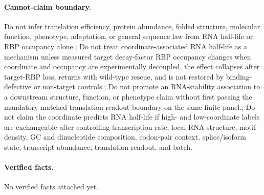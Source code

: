 \paragraph{Cannot-claim boundary.} Do not infer translation efficiency, protein abundance, folded structure, molecular function, phenotype, adaptation, or general sequence law from RNA half-life or RBP occupancy alone.; Do not treat coordinate-associated RNA half-life as a mechanism unless measured target decay-factor RBP occupancy changes when coordinate and occupancy are experimentally decoupled, the effect collapses after target-RBP loss, returns with wild-type rescue, and is not restored by binding-defective or non-target controls.; Do not promote an RNA-stability association to a downstream structure, function, or phenotype claim without first passing the mandatory matched translation-readout boundary on the same finite panel.; Do not claim the coordinate predicts RNA half-life if high- and low-coordinate labels are exchangeable after controlling transcription rate, local RNA structure, motif density, GC and dinucleotide composition, codon-pair context, splice/isoform state, transcript abundance, translation readout, and batch.

\paragraph{Verified facts.}
No verified facts attached yet.
